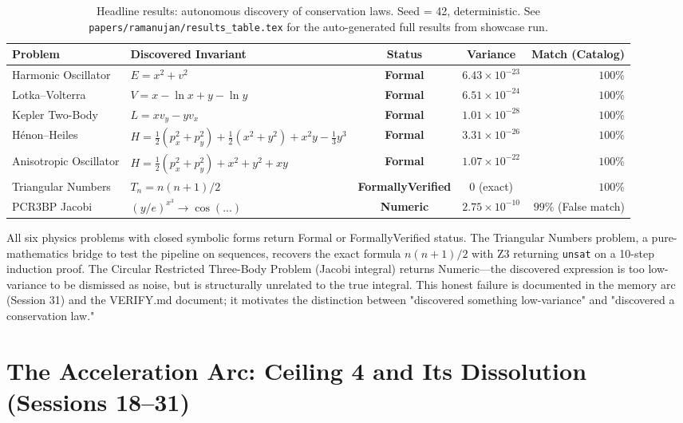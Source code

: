 \begin{table}[H]
\centering
\caption{Headline results: autonomous discovery of conservation laws. Seed = 42, deterministic. See \texttt{papers/ramanujan/results\_table.tex} for the auto-generated full results from showcase run.}
\label{tab:ramanujan-results-headline}
\begin{tabular}{llccr}
\toprule
\textbf{Problem} & \textbf{Discovered Invariant} & \textbf{Status} & \textbf{Variance} & \textbf{Match (Catalog)} \\
\midrule
Harmonic Oscillator & $E = x^2 + v^2$ & \textbf{Formal} & $6.43 \times 10^{-23}$ & $100\%$ \\
Lotka--Volterra & $V = x - \ln x + y - \ln y$ & \textbf{Formal} & $6.51 \times 10^{-24}$ & $100\%$ \\
Kepler Two-Body & $L = xv_y - yv_x$ & \textbf{Formal} & $1.01 \times 10^{-28}$ & $100\%$ \\
Hénon--Heiles & $H = \tfrac{1}{2}(p_x^2 + p_y^2) + \tfrac{1}{2}(x^2 + y^2) + x^2 y - \tfrac{1}{3}y^3$ & \textbf{Formal} & $3.31 \times 10^{-26}$ & $100\%$ \\
Anisotropic Oscillator & $H = \tfrac{1}{2}(p_x^2 + p_y^2) + x^2 + y^2 + xy$ & \textbf{Formal} & $1.07 \times 10^{-22}$ & $100\%$ \\
Triangular Numbers & $T_n = n(n+1)/2$ & \textbf{FormallyVerified} & $0$ (exact) & $100\%$ \\
PCR3BP Jacobi & $(y/e)^{x^3} \to \cos(...)$ & \textbf{Numeric} & $2.75 \times 10^{-10}$ & $99\%$ (False match) \\
\bottomrule
\end{tabular}
\end{table}

All six physics problems with closed symbolic forms return Formal or FormallyVerified status. The Triangular Numbers problem, a pure-mathematics bridge to test the pipeline on sequences, recovers the exact formula $n(n+1)/2$ with Z3 returning \texttt{unsat} on a 10-step induction proof. The Circular Restricted Three-Body Problem (Jacobi integral) returns Numeric---the discovered expression is too low-variance to be dismissed as noise, but is structurally unrelated to the true integral. This honest failure is documented in the memory arc (Session 31) and the VERIFY.md document; it motivates the distinction between "discovered something low-variance" and "discovered a conservation law."

\section{The Acceleration Arc: Ceiling 4 and Its Dissolution (Sessions 18--31)}

